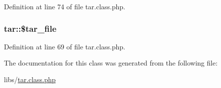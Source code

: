 Definition at line 74 of file tar.\+class.\+php.

\hypertarget{classtar_afea782413237d583b7611a1c5410f2c5}{
\subsubsection[{\$tar\+\_\+file}]{\setlength{\rightskip}{0pt plus 5cm}tar\+::\$tar\+\_\+file}}\label{classtar_afea782413237d583b7611a1c5410f2c5}


Definition at line 69 of file tar.\+class.\+php.



The documentation for this class was generated from the following file\+:\begin{DoxyCompactItemize}
\item 
libs/\hyperlink{tar_8class_8php}{tar.\+class.\+php}\end{DoxyCompactItemize}
